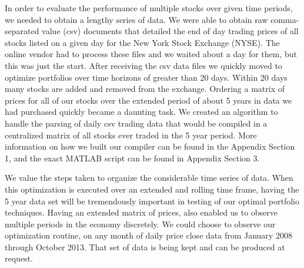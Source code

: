 
In order to evaluate the performance of multiple stocks over given time periods, we needed to obtain a lengthy series of data.  We were able to obtain raw comma-separated value (csv) documents that detailed the end of day trading prices of all stocks listed on a given day for the New York Stock Exchange (NYSE).  The online vendor had to process these files and we waited about a day for them, but this was just the start\cite{back9}.  After receiving the csv data files we quickly moved to optimize portfolios over time horizons of greater than 20 days.  Within 20 days many stocks are added and removed from the exchange.  Ordering a matrix of prices for all of our stocks over the extended period of about 5 years in data we had purchased quickly became a daunting task.  We created an algorithm to handle the parsing of daily csv trading data that would be compiled in a centralized matrix of all stocks ever traded in the 5 year period.  More information on how we built our compiler can be found in the Appendix Section 1, and the exact MATLAB script can be found in Appendix Section 3.  

	We value the steps taken to organize the considerable time series of data.  When this optimization is executed over an extended and rolling time frame, having the 5 year data set will be tremendously important in testing of our optimal portfolio techniques.  Having an extended matrix of prices, also enabled us to observe multiple periods in the economy discretely.  We could choose to observe our optimization routine, on any month of daily price close data from January 2008 through October 2013.   That set of data is being kept and can be produced at request.